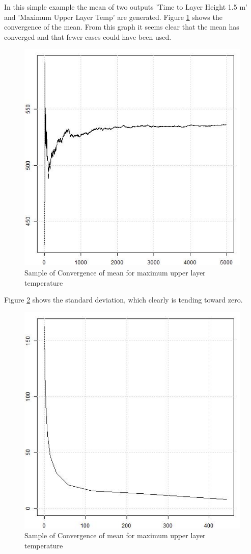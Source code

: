 \documentclass[12pt,twoside]{book}
\begin{document}
In this simple example the mean of two outputs {\ct 'Time to Layer Height 1.5 m'} and {\ct 'Maximum Upper Layer Temp'} are generated. Figure \ref{simple_max_temp_mean} shows the convergence of the mean. From this graph it seems clear that the mean has converged and that fewer cases could have been used.

\begin{figure}[h!]
\centering
\includegraphics[width=4.5in]{FIGURES/simple_max_temp_mean.jpeg}
\caption{Sample of Convergence of mean for maximum upper layer temperature}
\label{simple_max_temp_mean}
\end{figure}

Figure \ref{simple_max_temp_sd} shows the standard deviation, which clearly is tending toward zero.

\begin{figure}[h!]
\centering
\includegraphics[width=4.5in]{FIGURES/simple_max_temp_sd.jpeg}
\caption{Sample of Convergence of mean for maximum upper layer temperature}
\label{simple_max_temp_sd}
\end{figure}
\end{document}
